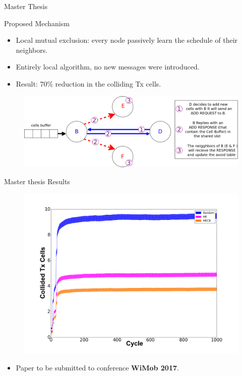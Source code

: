 \documentclass{beamer}
\begin{document}
\begin{frame}{Master Thesis}

\begin{block}{Proposed Mechanism}
    \begin{itemize}
    \item Local mutual exclusion: every node passively learn the schedule of their neighbors. 
    \item<2-> Entirely local algorithm, no new messages were introduced.
     \item<3-> Result: 70\% reduction in the colliding Tx cells.
     
    \end{itemize}
    \end{block}


\centering
\begin{figure}[ht]

\item<2-> \includegraphics[width=.85\linewidth]{collision.png}

\end{figure}
\end{frame}

\begin{frame}{Master thesis Results}


\begin{figure}[ht]


 \includegraphics[width=.78\linewidth]{Graph2.png}
\end{figure}


\begin{itemize}
\item Paper to be submitted to conference \textbf{WiMob 2017}.
\end{itemize}
\end{frame}
\end{document}
